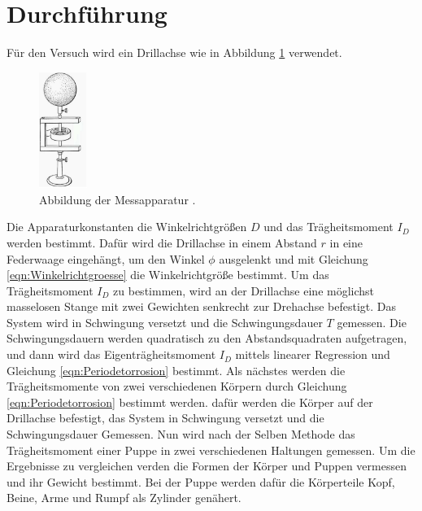\section{Durchführung}
\label{sec:Durchführung}
Für den Versuch wird ein Drillachse wie in Abbildung \ref{fig:Drillachse} verwendet.
\begin{figure}
  \centering
  \includegraphics[width=0.14\textwidth]{Drillachse.png}
  \caption{Abbildung der Messapparatur \cite{sample}.}
  \label{fig:Drillachse}
\end{figure}
Die Apparaturkonstanten die Winkelrichtgrößen $D$ und das Trägheitsmoment $I_D$ werden bestimmt.
Dafür wird die Drillachse in einem Abstand $r$ in eine Federwaage eingehängt, um den Winkel $\phi$
ausgelenkt und mit Gleichung \eqref{eqn:Winkelrichtgroesse} die Winkelrichtgröße bestimmt.
Um das Trägheitsmoment $I_D$ zu bestimmen, wird an der Drillachse eine möglichst masselosen Stange
mit zwei Gewichten senkrecht zur Drehachse befestigt. Das System wird in Schwingung
versetzt und die Schwingungsdauer $T$ gemessen. Die Schwingungsdauern werden quadratisch
zu den Abstandsquadraten aufgetragen, und dann wird das Eigenträgheitsmoment $I_D$ mittels
linearer Regression und Gleichung \eqref{eqn:Periodetorrosion} bestimmt.
Als nächstes werden die Trägheitsmomente von zwei verschiedenen Körpern durch
Gleichung \eqref{eqn:Periodetorrosion} bestimmt werden. dafür werden die Körper auf der Drillachse
befestigt, das System in Schwingung versetzt und die Schwingungsdauer Gemessen.
Nun wird nach der Selben Methode das Trägheitsmoment einer Puppe in zwei verschiedenen
Haltungen gemessen. Um die Ergebnisse zu vergleichen verden die Formen der Körper
und Puppen vermessen und ihr Gewicht bestimmt. Bei der Puppe werden dafür die Körperteile
Kopf, Beine, Arme und Rumpf als Zylinder genähert.
